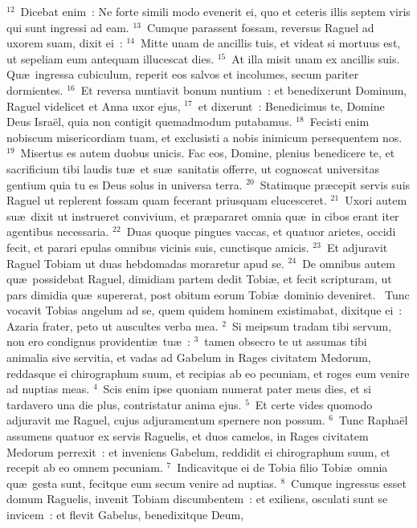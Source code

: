 ${}^{12}$~Dicebat enim~: Ne forte simili modo evenerit ei, quo et ceteris illis septem viris qui sunt ingressi ad eam.
${}^{13}$~Cumque parassent fossam, reversus Raguel ad uxorem suam, dixit ei~:
${}^{14}$~Mitte unam de ancillis tuis, et videat si mortuus est, ut sepeliam eum antequam illucescat dies.
${}^{15}$~At illa misit unam ex ancillis suis. Qu\ae\ ingressa cubiculum, reperit eos salvos et incolumes, secum pariter dormientes.
${}^{16}$~Et reversa nuntiavit bonum nuntium~: et benedixerunt Dominum, Raguel videlicet et Anna uxor ejus,
${}^{17}$~et dixerunt~: Benedicimus te, Domine Deus Isra\"el, quia non contigit quemadmodum putabamus.
${}^{18}$~Fecisti enim nobiscum misericordiam tuam, et exclusisti a nobis inimicum persequentem nos.
${}^{19}$~Misertus es autem duobus unicis. Fac eos, Domine, plenius benedicere te, et sacrificium tibi laudis tu\ae\ et su\ae\ sanitatis offerre, ut cognoscat universitas gentium quia tu es Deus solus in universa terra.
${}^{20}$~Statimque pr\ae cepit servis suis Raguel ut replerent fossam quam fecerant priusquam elucesceret.
${}^{21}$~Uxori autem su\ae\ dixit ut instrueret convivium, et pr\ae pararet omnia qu\ae\ in cibos erant iter agentibus necessaria.
${}^{22}$~Duas quoque pingues vaccas, et quatuor arietes, occidi fecit, et parari epulas omnibus vicinis suis, cunctisque amicis.
${}^{23}$~Et adjuravit Raguel Tobiam ut duas hebdomadas moraretur apud se.
${}^{24}$~De omnibus autem qu\ae\ possidebat Raguel, dimidiam partem dedit Tobi\ae , et fecit scripturam, ut pars dimidia qu\ae\ supererat, post obitum eorum Tobi\ae\ dominio deveniret.
~Tunc vocavit Tobias angelum ad se, quem quidem hominem existimabat, dixitque ei~: Azaria frater, peto ut auscultes verba mea.
${}^{2}$~Si meipsum tradam tibi servum, non ero condignus providenti\ae\ tu\ae~:
${}^{3}$~tamen obsecro te ut assumas tibi animalia sive servitia, et vadas ad Gabelum in Rages civitatem Medorum, reddasque ei chirographum suum, et recipias ab eo pecuniam, et roges eum venire ad nuptias meas.
${}^{4}$~Scis enim ipse quoniam numerat pater meus dies, et si tardavero una die plus, contristatur anima ejus.
${}^{5}$~Et certe vides quomodo adjuravit me Raguel, cujus adjuramentum spernere non possum.
${}^{6}$~Tunc Rapha\"el assumens quatuor ex servis Raguelis, et duos camelos, in Rages civitatem Medorum perrexit~: et inveniens Gabelum, reddidit ei chirographum suum, et recepit ab eo omnem pecuniam.
${}^{7}$~Indicavitque ei de Tobia filio Tobi\ae\ omnia qu\ae\ gesta sunt, fecitque eum secum venire ad nuptias.
${}^{8}$~Cumque ingressus esset domum Raguelis, invenit Tobiam discumbentem~: et exiliens, osculati sunt se invicem~: et flevit Gabelus, benedixitque Deum,
